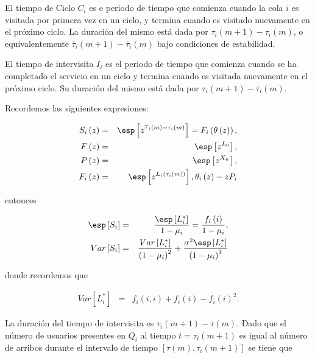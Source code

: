 \begin{Def}
El tiempo de Ciclo $C_{i}$ es e periodo de tiempo que comienza cuando la cola $i$ es visitada por primera vez en un ciclo, y termina cuando es visitado nuevamente en el pr\'oximo ciclo. La duraci\'on del mismo est\'a dada por $\tau_{i}\left(m+1\right)-\tau_{i}\left(m\right)$, o equivalentemente $\overline{\tau}_{i}\left(m+1\right)-\overline{\tau}_{i}\left(m\right)$ bajo condiciones de estabilidad.
\end{Def}

\begin{Def}
El tiempo de intervisita $I_{i}$ es el periodo de tiempo que comienza cuando se ha completado el servicio en un ciclo y termina cuando es visitada nuevamente en el pr\'oximo ciclo. Su  duraci\'on del mismo est\'a dada por $\tau_{i}\left(m+1\right)-\overline{\tau}_{i}\left(m\right)$.
\end{Def}


Recordemos las siguientes expresiones:

\begin{eqnarray*}
S_{i}\left(z\right)&=&\esp\left[z^{\overline{\tau}_{i}\left(m\right)-\tau_{i}\left(m\right)}\right]=F_{i}\left(\theta\left(z\right)\right),\\
F\left(z\right)&=&\esp\left[z^{L_{0}}\right],\\
P\left(z\right)&=&\esp\left[z^{X_{n}}\right],\\
F_{i}\left(z\right)&=&\esp\left[z^{L_{i}\left(\tau_{i}\left(m\right)\right)}\right],
\theta_{i}\left(z\right)-zP_{i}
\end{eqnarray*}

entonces 

\begin{eqnarray*}
\esp\left[S_{i}\right]&=&\frac{\esp\left[L_{i}^{*}\right]}{1-\mu_{i}}=\frac{f_{i}\left(i\right)}{1-\mu_{i}},\\
Var\left[S_{i}\right]&=&\frac{Var\left[L_{i}^{*}\right]}{\left(1-\mu_{i}\right)^{2}}+\frac{\sigma^{2}\esp\left[L_{i}^{*}\right]}{\left(1-\mu_{i}\right)^{3}}
\end{eqnarray*}

donde recordemos que

\begin{eqnarray*}
Var\left[L_{i}^{*}\right]&=&f_{i}\left(i,i\right)+f_{i}\left(i\right)-f_{i}\left(i\right)^{2}.
\end{eqnarray*}

La duraci\'on del tiempo de intervisita es $\tau_{i}\left(m+1\right)-\overline{\tau}\left(m\right)$. Dado que el n\'umero de usuarios presentes en $Q_{i}$ al tiempo $t=\tau_{i}\left(m+1\right)$ es igual al n\'umero de arribos durante el intervalo de tiempo $\left[\overline{\tau}\left(m\right),\tau_{i}\left(m+1\right)\right]$ se tiene que


